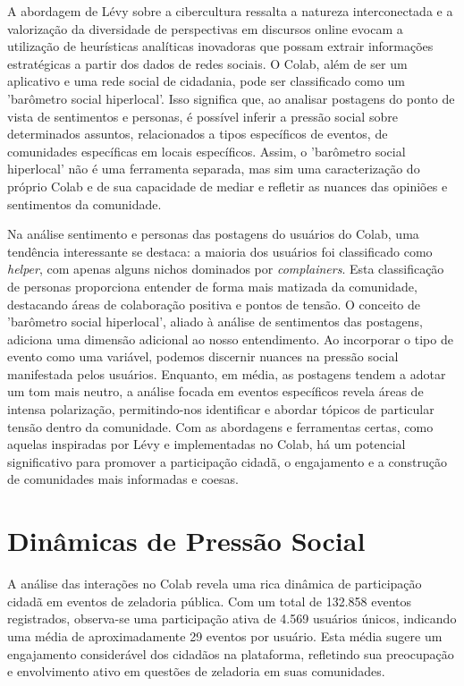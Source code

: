 A abordagem de Lévy sobre a cibercultura ressalta a natureza interconectada e a valorização da diversidade de perspectivas em discursos online evocam a utilização de heurísticas analíticas inovadoras que possam extrair informações estratégicas a partir dos dados de redes sociais. O Colab, além de ser um aplicativo e uma rede social de cidadania, pode ser classificado como um 'barômetro social hiperlocal'. Isso significa que, ao analisar postagens do ponto de vista de sentimentos e personas, é possível inferir a pressão social sobre determinados assuntos, relacionados a tipos específicos de eventos, de comunidades específicas em locais específicos. Assim, o 'barômetro social hiperlocal' não é uma ferramenta separada, mas sim uma caracterização do próprio Colab e de sua capacidade de mediar e refletir as nuances das opiniões e sentimentos da comunidade.

Na análise sentimento e personas das postagens do usuários do Colab, uma tendência interessante se destaca: a maioria dos usuários foi classificado como \textit{helper}, com apenas alguns nichos dominados por \textit{complainers}. Esta classificação de personas proporciona entender de forma mais matizada da comunidade, destacando áreas de colaboração positiva e pontos de tensão. O conceito de 'barômetro social hiperlocal', aliado à análise de sentimentos das postagens, adiciona uma dimensão adicional ao nosso entendimento. Ao incorporar o tipo de evento como uma variável, podemos discernir nuances na pressão social manifestada pelos usuários. Enquanto, em média, as postagens tendem a adotar um tom mais neutro, a análise focada em eventos específicos revela áreas de intensa polarização, permitindo-nos identificar e abordar tópicos de particular tensão dentro da comunidade. Com as abordagens e ferramentas certas, como aquelas inspiradas por Lévy e implementadas no Colab, há um potencial significativo para promover a participação cidadã, o engajamento e a construção de comunidades mais informadas e coesas.

\section{Dinâmicas de Pressão Social}

A análise das interações no Colab revela uma rica dinâmica de participação cidadã em eventos de zeladoria pública. Com um total de 132.858 eventos registrados, observa-se uma participação ativa de 4.569 usuários únicos, indicando uma média de aproximadamente 29 eventos por usuário. Esta média sugere um engajamento considerável dos cidadãos na plataforma, refletindo sua preocupação e envolvimento ativo em questões de zeladoria em suas comunidades.

